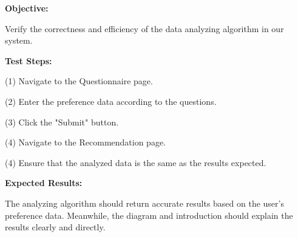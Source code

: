 \documentclass[conference]{IEEEtran}
\begin{document}
\textbf{ Objective: }

Verify the correctness and efficiency of the data analyzing algorithm in our system.

\textbf{Test Steps: }

(1) Navigate to the Questionnaire page.

(2) Enter the preference data according to the questions.

(3) Click the "Submit" button.

(4) Navigate to the Recommendation page.

(4) Ensure that the analyzed data is the same as the results expected.

\textbf{Expected Results: }

The analyzing algorithm should return accurate results based on the user's preference data. Meanwhile, the diagram and introduction should explain the results clearly and directly.
\end{document}
